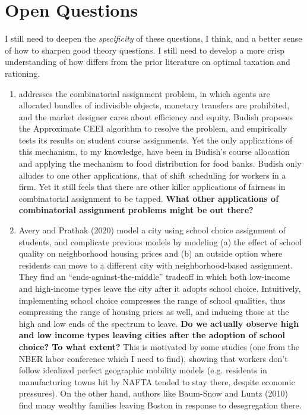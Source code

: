 \documentclass[JEL]{AEA}
\begin{document}
\section{Open Questions}

I still need to deepen the \emph{specificity} of these questions, I think, and a better sense of how to sharpen good theory questions. I still need to develop a more crisp understanding of how \cite{dworczak-2020} differs from the prior literature on optimal taxation and rationing.

\begin{enumerate}    
    \item \cite{budish-2011} addresses the combinatorial assignment problem, in which agents are allocated bundles of indivisible objects, monetary transfers are prohibited, and the market designer cares about efficiency and equity. Budish proposes the Approximate CEEI algorithm to resolve the problem, and empirically tests its results on student course assignments. Yet the only applications of this mechanism, to my knowledge, have been in Budish's course allocation and \cite{prendergast-2017} applying the mechanism to food distribution for food banks. Budish only alludes to one other applications, that of shift scheduling for workers in a firm. Yet it still feels that there are other killer applications of fairness in combinatorial assignment to be tapped. \textbf{What other applications of combinatorial assignment problems might be out there?}
    
    \item Avery and Prathak (2020) model a city using school choice assignment of students, and complicate previous models by modeling (a) the effect of school quality on neighborhood housing prices and (b) an outside option where residents can move to a different city with neighborhood-based assignment. They find an “ends-against-the-middle” tradeoff in which both low-income and high-income types leave the city after it adopts school choice. Intuitively, implementing school choice compresses the range of school qualities, thus compressing the range of housing prices as well, and inducing those at the high and low ends of the spectrum to leave. \textbf{Do we actually observe high and low income types leaving cities after the adoption of school choice? To what extent?} This is motivated by some studies (one from the NBER labor conference which I need to find), showing that workers don’t follow idealized perfect geographic mobility models (e.g. residents in manufacturing towns hit by NAFTA tended to stay there, despite economic pressures). On the other hand, authors like Baum-Snow and Luntz (2010) find many wealthy families leaving Boston in response to desegregation there.
    

\end{enumerate}
\end{document}
